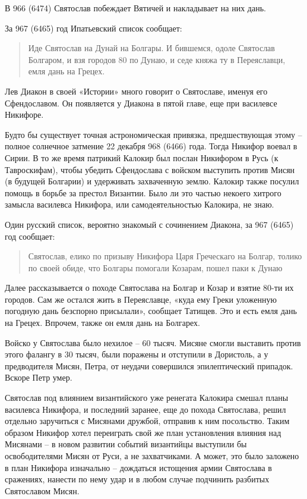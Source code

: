 В 966 (6474) Святослав побеждает Вятичей и накладывает на них дань.

За 967 (6465) год Ипатьевский список сообщает:

\begin{quotation}
Иде Святослав на Дунай на Болгары. И бившемся, одоле Святослав Болгаром, и взя городов 80 по Дунаю, и седе княжа ту в Переяславци, емля дань на Грецех.
\end{quotation}

Лев Диакон в своей «Истории» много говорит о Святославе, именуя его Сфендославом. Он появляется у Диакона в пятой главе, еще при василевсе Никифоре. 

Будто бы существует точная астрономическая привязка, предшествующая этому – полное солнечное затмение 22 декабря 968 (6466) года. Тогда Никифор воевал в Сирии. В то же время патрикий Калокир был послан Никифором в Русь (к Тавроскифам), чтобы убедить Сфендослава с войском выступить против Мисян (в будущей Болгарии) и удерживать захваченную землю. Калокир также посулил помощь в борьбе за престол Византии. Было ли это частью некоего хитрого замысла василевса Никифора, или самодеятельностью Калокира, не знаю.

Один русский список, вероятно знакомый с сочинением Диакона, за 967 (6465) год сообщает:

\begin{quotation}
Святослав, елико по призыву Никифора Царя Греческаго на Болгар, толико по своей обиде, что Болгары помогали Козарам, пошел паки к Дунаю
\end{quotation}

Далее рассказывается о походе Святослава на Болгар и Козар и взятие 80-ти их городов. Сам же остался жить в Переяславце, «куда ему Греки уложенную погодную дань безспорно присылали», сообщает Татищев. Это и есть емля дань на Грецех. Впрочем, также он емля дань на Болгарех. 

Войско у Святослава было нехилое – 60 тысяч. Мисяне смогли выставить против этого фалангу в 30 тысяч, были поражены и отступили в Дористоль, а у предводителя Мисян, Петра, от неудачи совершился эпилептический припадок. Вскоре Петр умер.

Святослав под влиянием византийского уже ренегата Калокира смешал планы василевса Никифора, и последний заранее, еще до похода Святослава, решил отдельно заручиться с Мисянами дружбой, отправив к ним посольство. Таким образом Никифор хотел переиграть свой же план установления влияния над Мисянами – в новом развитии событий византийцы выступили бы освободителями Мисян от Руси, а не захватчиками. А может, это было заложено в план Никифора изначально – дождаться истощения армии Святослава в сражениях, нанести по нему удар и в любом случае подчинить разбитых Святославом Мисян.

